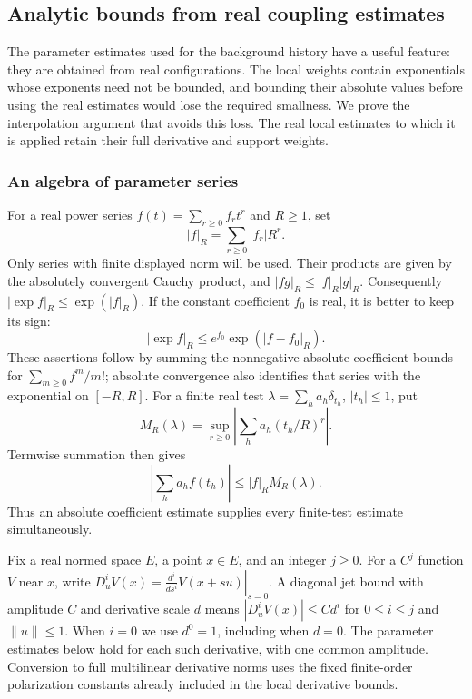 \subsection{Analytic bounds from real coupling estimates}
\label{sec:real-coupling-interpolation}
The parameter estimates used for the background history have a useful
feature: they are obtained from real configurations. The local weights
contain exponentials whose exponents need not be bounded, and bounding
their absolute values before using the real estimates would lose the
required smallness. We prove the interpolation argument that avoids
this loss. The real local estimates to which it is applied retain their
full derivative and support weights.

\subsubsection{An algebra of parameter series}
For a real power series $f(t)=\sum_{r\ge0}f_rt^r$ and $R\ge1$, set
\[
                         |f|_R=\sum_{r\ge0}|f_r|R^r.
\]
Only series with finite displayed norm will be used. Their products
are given by the absolutely convergent Cauchy product, and
$|fg|_R\le |f|_R|g|_R$. Consequently
$|\exp f|_R\le\exp(|f|_R)$. If the constant coefficient $f_0$
is real, it is better to keep its sign:
\begin{equation}\label{eq:real-series-exponential}
                 |\exp f|_R\le e^{f_0}\exp(|f-f_0|_R).
\end{equation}
These assertions follow by summing the nonnegative absolute
coefficient bounds for $\sum_{m\ge0}f^m/m!$; absolute convergence
also identifies that series with the exponential on $[-R,R]$.
For a finite real test $\lambda=\sum_ha_h\delta_{t_h}$,
$|t_h|\le1$, put
\[
             M_R(\lambda)=\sup_{r\ge0}
                          \left|\sum_h a_h(t_h/R)^r\right|.
\]
Termwise summation then gives
\begin{equation}\label{eq:real-series-test}
                    \left|\sum_h a_h f(t_h)\right|
                                      \le |f|_R M_R(\lambda).
\end{equation}
Thus an absolute coefficient estimate supplies every finite-test
estimate simultaneously.

Fix a real normed space $E$, a point $x\in E$, and an integer $j\ge0$.
For a $C^j$ function $V$ near $x$, write
$D_u^iV(x)=\left.\frac{d^i}{ds^i}V(x+su)\right|_{s=0}$.
A diagonal jet bound with amplitude $C$ and derivative scale $d$
means $|D_u^iV(x)|\le C d^i$ for $0\le i\le j$ and
$\|u\|\le1$. When $i=0$ we use $d^0=1$, including when $d=0$.
The parameter estimates below hold for each such derivative, with
one common amplitude. Conversion to full multilinear derivative
norms uses the fixed finite-order polarization constants already
included in the local derivative bounds.

